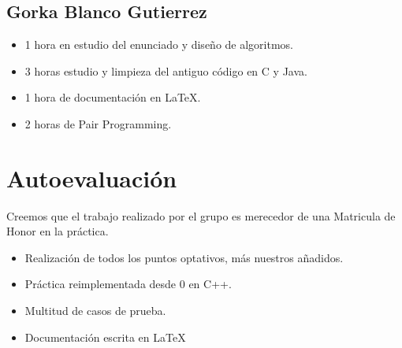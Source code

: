     \section{Gorka Blanco Gutierrez}
    
        \begin{itemize}
            \item 1 hora en estudio del enunciado y diseño de algoritmos.
            \item 3 horas estudio y limpieza del antiguo código en C y Java.
            \item 1 hora de documentación en \LaTeX.
            \item 2 horas de Pair Programming.
        \end{itemize}
        
        
\chapter{Autoevaluación}
     
     Creemos que el trabajo realizado por el grupo es merecedor de una Matricula de Honor en la práctica.
     
     \begin{itemize}
     
     	\item Realización de todos los puntos optativos, más nuestros añadidos.
	
		\item Práctica reimplementada desde 0 en C++.
		
		\item Multitud de casos de prueba.
		
		\item Documentación escrita en \LaTeX
		
	\end{itemize}
	
	